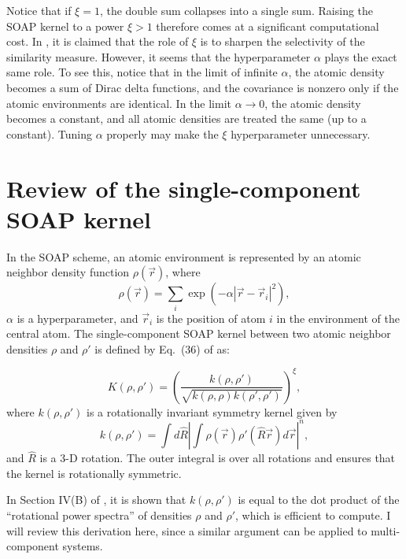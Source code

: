 \documentclass[%
preprint,
amsmath,amssymb,
aps,
]{revtex4-1}
\begin{document}
Notice that if $\xi = 1$, the double sum collapses into a single sum. Raising the SOAP kernel to a power $\xi > 1$ therefore comes at a significant computational cost. In \cite{szlachta2014accuracy}, it is claimed that the role of $\xi$ is to sharpen the selectivity of the similarity measure. However, it seems that the hyperparameter $\alpha$ plays the exact same role. To see this, notice that in the limit of infinite $\alpha$, the atomic density becomes a sum of Dirac delta functions, and the covariance is nonzero only if the atomic environments are identical. In the limit $\alpha \rightarrow 0$, the atomic density becomes a constant, and all atomic densities are treated the same (up to a constant). Tuning $\alpha$ properly may make the $\xi$ hyperparameter unnecessary.


\section{Review of the single-component SOAP kernel}

In the SOAP scheme, an atomic environment is represented by an atomic neighbor density function $\rho(\vec{r})$, where
\begin{equation}
\rho(\vec{r}) = \sum_i \exp\left(-\alpha | \vec{r} - \vec{r}_i|^2 \right),
\end{equation}
$\alpha$ is a hyperparameter, and $\vec{r}_i$ is the position of atom $i$ in the environment of the central atom. The single-component SOAP kernel between two atomic neighbor densities $\rho$ and $\rho'$ is defined by Eq.\ (36) of \cite{bartok2013representing} as:

\begin{equation}
    K(\rho, \rho') = \left(\frac{k (\rho, \rho')}{\sqrt{k(\rho, \rho) k(\rho', \rho')}} \right) ^{\xi},
\end{equation}
where $k(\rho, \rho')$ is a rotationally invariant symmetry kernel given by
\begin{equation}
k(\rho, \rho') = \int d\hat{R} \left| \int \rho(\vec{r}) \rho'(\hat{R}\vec{r}) d\vec{r} \right| ^n,
\end{equation}
and $\hat{R}$ is a 3-D rotation. The outer integral is over all rotations and ensures that the kernel is rotationally symmetric.

In Section IV(B) of \cite{bartok2013representing}, it is shown that $k(\rho, \rho')$ is equal to the dot product of the ``rotational power spectra'' of densities $\rho$ and $\rho'$, which is efficient to compute. I will review this derivation here, since a similar argument can be applied to multi-component systems.
\end{document}
